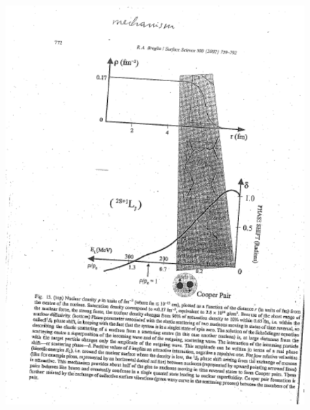 \documentclass[a4paper,11pt]{book}
\numberwithin{equation}{section}
\numberwithin{figure}{section}
\numberwithin{table}{section}
\begin{document}
\begin{figure}
\centerline{\includegraphics*[width=\textwidth,angle=0]{figs/box4_3.pdf}}
\end{figure}
\end{document}
